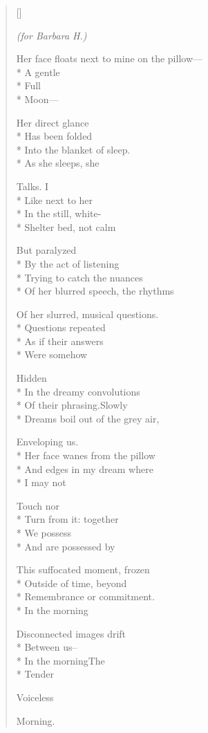 \label{ch:poem_from_a_restless_sleep}
\settowidth{\versewidth}{Her face floats next to mine on the pillow--}
\begin{verse}[\versewidth]
\epigraph{\textit{(for Barbara H.)}}{}

Her face floats next to mine on the pillow---\\*
A gentle\\*
Full\\*
Moon---

Her direct glance\\*
Has been folded\\*
Into the blanket of sleep.\\*
As she sleeps, she

Talks. I\\*
Like next to her\\*
In the still, white-\\*
Shelter bed, not calm

But paralyzed\\*
By the act of listening\\*
Trying to catch the nuances\\*
Of her blurred speech, the rhythms

Of her slurred, musical questions.\\*
Questions repeated\\*
As if their answers\\*
Were somehow

Hidden\\*
In the dreamy convolutions\\*
Of their phrasing.\qquad Slowly\\*
Dreams boil out of the grey air,

Enveloping us.\\*
Her face wanes from the pillow\\*
And edges in my dream where\\*
I may not

Touch nor\\*
Turn from it: together\\*
We possess\\*
And are possessed by

This suffocated moment, frozen\\*
Outside of time, beyond\\*
Remembrance or commitment.\\*
In the morning

Disconnected images drift\\*
Between us--\\*
In the morning\qquad The\\*
Tender

Voiceless

Morning.
\end{verse}
